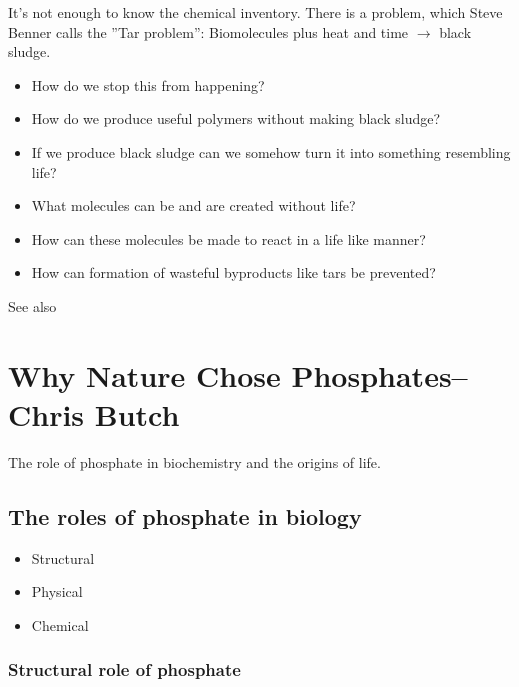 \documentclass[]{article}
\begin{document}
It's not enough to know the chemical inventory. There is a problem, which Steve Benner calls the ''Tar problem'': Biomolecules plus heat and time $\rightarrow$ black sludge.\cite{benner2012asphalt}

\begin{itemize}
	\item How do we stop this from happening?
	\item How do we produce useful polymers without making black sludge? 
	\item If we produce black sludge can we somehow turn it into something resembling life?
	\item What molecules can be and are created without life?
	\item How can these molecules be made to react in a life like manner?
	\item How can formation of wasteful byproducts like	tars be prevented?
\end{itemize}


See also \cite{lazcano20031953}

\section[Why Nature Chose Phosphates]{Why Nature Chose Phosphates--Chris Butch}


The role of phosphate in biochemistry and the origins of life.

\subsection{The roles of phosphate in biology}

\begin{itemize}
	\item Structural
	\item Physical
	\item Chemical
\end{itemize}

\subsubsection{Structural role of phosphate}
\end{document}
